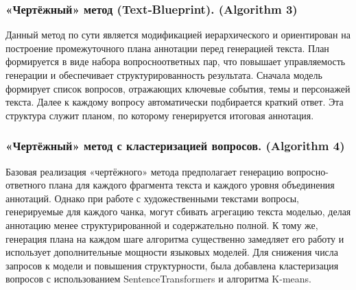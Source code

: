 \documentclass{article}
\begin{document}
\vspace{0.4em}
\subsubsection*{«Чертёжный» метод (Text‑Blueprint). (Algorithm 3)}
Данный метод \cite{blueprint} по сути является модификацией иерархического и ориентирован на построение промежуточного
плана аннотации перед генерацией текста. План формируется в виде набора вопросноответных пар, что повышает управляемость генерации и обеспечивает структурированность результата.
Сначала модель формирует список вопросов, отражающих ключевые события, темы
и персонажей текста. Далее к каждому вопросу автоматически подбирается краткий
ответ. Эта структура служит планом, по которому генерируется итоговая аннотация.


\subsubsection*{«Чертёжный» метод с кластеризацией вопросов. (Algorithm 4)}
Базовая реализация «чертёжного» метода предполагает генерацию вопросно-ответного
плана для каждого фрагмента текста и каждого уровня объединения аннотаций. Однако при работе с художественными текстами вопросы, генерируемые для каждого чанка,
могут сбивать агрегацию текста моделью, делая аннотацию менее структурированной
и содержательно полной. К тому же, генерация плана на каждом шаге алгоритма существенно замедляет его работу и использует дополнительные мощности языковых моделей.
Для снижения числа запросов к модели и повышения структурности, была добавлена кластеризация вопросов с использованием SentenceTransformers и алгоритма K-means.
\end{document}
